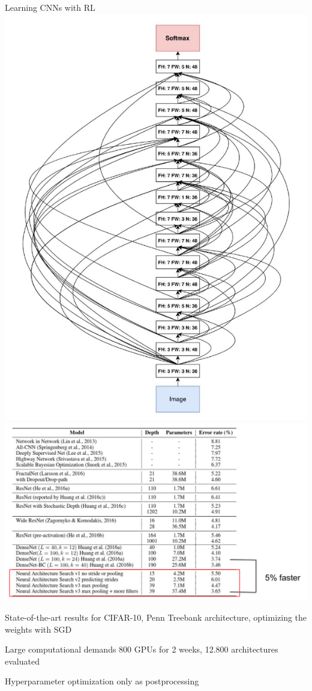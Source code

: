 \begin{frame}[c]{Learning CNNs with RL }
\centering
\includegraphics[width=.3\textwidth]{images_lec7/RL_CNN}
\includegraphics[width=.69\textwidth]{images_lec7/RL_results_table}

\begin{itemize}
\footnotesize{
	\item State-of-the-art results for CIFAR-10, Penn Treebank
	architecture, optimizing the weights with SGD
	\item Large computational demands \alert{800 GPUs for 2 weeks, 
	12.800 architectures evaluated}
	\item Hyperparameter optimization only as postprocessing
}
\end{itemize}
\end{frame}

